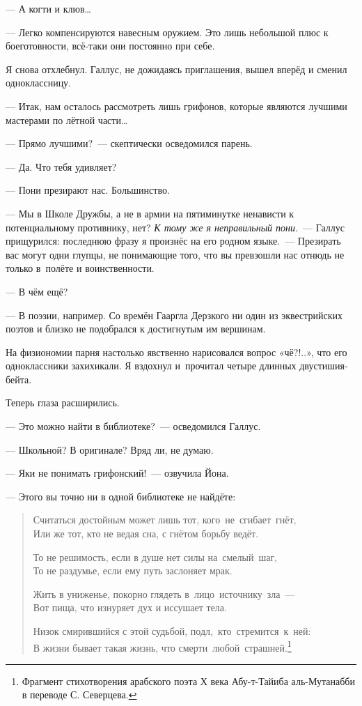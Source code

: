 \documentclass[fontsize=11pt,a5paper,titlepage=firstcover]{scrbook}
\begin{document}
--- А когти и клюв{\ldots}

--- Легко компенсируются навесным оружием. Это лишь небольшой плюс к боеготовности, всё-таки они постоянно при себе.

Я снова отхлебнул. Галлус, не дожидаясь приглашения, вышел вперёд и сменил одноклассницу.

--- Итак, нам осталось рассмотреть лишь грифонов, которые являются лучшими мастерами по лётной части{\ldots}

--- Прямо лучшими?~--- скептически осведомился парень.

--- Да. Что тебя удивляет?

--- Пони презирают нас. Большинство.

--- Мы в Школе Дружбы, а не в армии на пятиминутке ненависти к потенциальному противнику, нет? \emph{К тому же я неправильный пони}.~--- Галлус прищурился: последнюю фразу я произнёс на его родном языке.~--- Презирать вас могут одни глупцы, не понимающие того, что вы превзошли нас отнюдь не только в~полёте и воинственности.

--- В чём ещё?

--- В поэзии, например. Со времён Гааргла Дерзкого ни один из эквестрийских поэтов и близко не подобрался к достигнутым им вершинам.

На физиономии парня настолько явственно нарисовался вопрос «чё?!..», что его одноклассники захихикали. Я вздохнул и~прочитал четыре длинных двустишия-бейта.

Теперь глаза расширились.

--- Это можно найти в библиотеке?~--- осведомился Галлус.

--- Школьной? В оригинале? Вряд ли, не думаю.

--- Яки не понимать грифонский!~--- озвучила Йона.

--- Этого вы точно ни в одной библиотеке не найдёте:

\begin{verse} 
\textsf{Считаться достойным может лишь тот, \mbox{кого не сгибает гнёт,}}\\
\textsf{Или же тот, кто не ведая сна, с гнётом борьбу ведёт.}

\textsf{То не решимость, если в душе нет силы \mbox{на смелый шаг,}}\\
\textsf{То не раздумье, если ему путь заслоняет мрак.}

\textsf{Жить в униженье, покорно глядеть \mbox{в лицо источнику зла~---}}\\
\textsf{Вот пища, что изнуряет дух и иссушает тела.}

\textsf{Низок смирившийся с этой судьбой, \mbox{подл, кто стремится к ней:}}\\
\textsf{В жизни бывает такая жизнь, что \mbox{смерти любой страшней.}}\footnote{Фрагмент стихотворения арабского поэта Х века Абу-т-Тайиба аль-Мутанабби в переводе С. Северцева.}
\end{verse}
\end{document}
